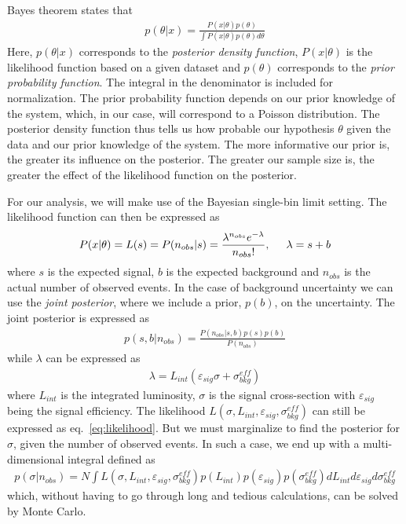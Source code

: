 \documentclass[12pt,a4paper]{amsart}
\begin{document}
Bayes theorem states that
\begin{align}
p(\theta|x) = \frac{P(x|\theta)p(\theta)}{\int P(x|\theta)p(\theta)d\theta} \label{eq:Bayes}
\end{align}
Here, $p(\theta|x)$ corresponds to the \textit{posterior density function}, $P(x|\theta)$ is the likelihood function based on a given dataset and $p(\theta)$ corresponds to the \textit{prior probability function}. The integral in the denominator is included for normalization. The prior probability function depends on our prior knowledge of the system, which, in our case, will correspond to a Poisson distribution. The posterior density function thus tells us how probable our hypothesis $\theta$ given the data and our prior knowledge of the system. The more informative our prior is, the greater its influence on the posterior. The greater our sample size is, the greater the effect of the likelihood function on the posterior.

For our analysis, we will make use of the Bayesian single-bin limit setting. The likelihood function can then be expressed as
\begin{align}
P(x|\theta) = L(s) = P(n_{obs}|s) = \frac{\lambda^{n_{obs}} e^{-\lambda}}{n_{obs}!}, \hspace{.5cm}\lambda=s+b	\label{eq:likelihood}
\end{align}
where $s$ is the expected signal, $b$ is the expected background and $n_{obs}$ is the actual number of observed events. In the case of background uncertainty we can use the \textit{joint posterior}, where we include a prior, $p(b)$, on the uncertainty. The joint posterior is expressed as
\begin{align}
p(s, b|n_{obs}) = \frac{P(n_{obs}|s, b)p(s)p(b)}{P(n_{obs})}	\label{eq:joint_posterior}
\end{align}
while $\lambda$ can be expressed as 
\begin{align}
\lambda = L_{int}(\varepsilon_{sig}\sigma + \sigma^{eff}_{bkg})
\end{align}
where $L_{int}$ is the integrated luminosity, $\sigma$ is the signal cross-section with $\varepsilon_{sig}$ being the signal efficiency. The likelihood $L(\sigma, L_{int}, \varepsilon_{sig}, \sigma^{eff}_{bkg})$ can still be expressed as eq.~\eqref{eq:likelihood}. But we must marginalize to find the posterior for $\sigma$, given the number of observed events. In such a case, we end up with a multi-dimensional integral defined as
\begin{align}
p(\sigma|n_{obs}) = N\int L(\sigma, L_{int}, \varepsilon_{sig}, \sigma^{eff}_{bkg})p(L_{int})p(\varepsilon_{sig})p(\sigma_{bkg}^{eff})dL_{int}d\varepsilon_{sig}d\sigma_{bkg}^{eff}	\label{eq:multidim_posterior}
\end{align}
which, without having to go through long and tedious calculations, can be solved by Monte Carlo.
\end{document}
